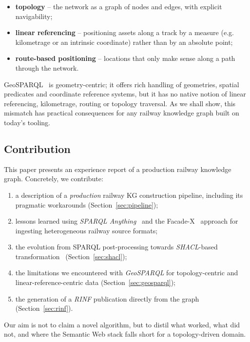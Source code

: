 \documentclass{ceurart}
\begin{document}
\begin{itemize}
  \item \textbf{topology} -- the network as a graph of nodes and edges, with
        explicit navigability;
  \item \textbf{linear referencing} -- positioning assets along a track by a
        measure (e.g. kilometrage or an intrinsic coordinate) rather than by an
        absolute point;
  \item \textbf{route-based positioning} -- locations that only make sense along
        a path through the network.
\end{itemize}

GeoSPARQL~\cite{geosparql} is geometry-centric; it offers rich handling of
geometries, spatial predicates and coordinate reference systems, but it has no
native notion of linear referencing, kilometrage, routing or topology
traversal. As we shall show, this mismatch has practical consequences for any
railway knowledge graph built on today's tooling.

\subsection{Contribution}

This paper presents an experience report of a production railway knowledge
graph. Concretely, we contribute:

\begin{enumerate}
  \item a description of a \emph{production} railway KG construction pipeline,
        including its pragmatic workarounds (Section~\ref{sec:pipeline});
  \item lessons learned using \emph{SPARQL Anything}~\cite{sparqlanything} and
        the Facade-X~\cite{facadex} approach for ingesting heterogeneous
        railway source formats;
  \item the evolution from SPARQL post-processing towards \emph{SHACL}-based
        transformation~\cite{shacl,shaclaf} (Section~\ref{sec:shacl});
  \item the limitations we encountered with \emph{GeoSPARQL} for
        topology-centric and linear-reference-centric data
        (Section~\ref{sec:geosparql});
  \item the generation of a \emph{RINF} publication directly from the graph
        (Section~\ref{sec:rinf}).
\end{enumerate}

Our aim is not to claim a novel algorithm, but to distil what worked, what did
not, and where the Semantic Web stack falls short for a topology-driven domain.
\end{document}
